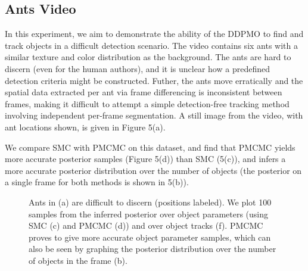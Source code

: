 \documentclass{article}
\begin{document}
\subsection{Ants Video}
In this experiment, we aim to demonstrate the ability of the DDPMO to find and track objects in a difficult detection scenario. The video contains six ants with a similar texture and color distribution as the background. The ants are hard to discern (even for the human authors), and it is unclear how a predefined detection criteria might be constructed. Futher, the ants move erratically and the spatial data extracted per ant via frame differencing is inconsistent between frames, making it difficult to attempt a simple detection-free tracking method involving independent per-frame segmentation. A still image from the video, with ant locations shown, is given in Figure 5(a).

We compare SMC with PMCMC on this dataset, and find that PMCMC yields more accurate posterior samples (Figure 5(d)) than SMC (5(c)), and infers a more accurate posterior distribution over the number of objects (the posterior on a single frame for both methods is shown in 5(b)).
\begin{figure}[h!tbp]
        \caption{\label{fig:antsFig} Ants in (a) are difficult to discern (positions labeled). We plot 100 samples from the inferred posterior over object parameters (using SMC (c) and PMCMC (d)) and over object tracks (f). PMCMC proves to give more accurate object parameter samples, which can also be seen by graphing the posterior distribution over the number of objects in the frame (b).}
\end{figure}
\end{document}
